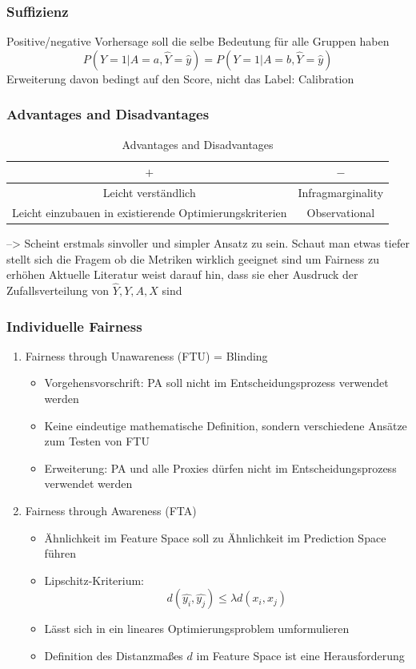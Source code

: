 \documentclass[aspectratio=169]{beamer}
\begin{document}
\begin{frame}
	\frametitle{Suffizienz}
	Positive/negative Vorhersage soll die selbe Bedeutung für alle Gruppen haben
	$$P(Y = 1 | A = a, \hat{Y} = \hat{y}) = P(Y = 1 | A = b, \hat{Y} = \hat{y})$$
	Erweiterung davon bedingt auf den Score, nicht das Label: Calibration
\end{frame}
\begin{frame}
	\frametitle{Advantages and Disadvantages}
	\begin{table}[H]
	\centering
	\begin{tabular}{c|c}
	\toprule
	$+$ & $-$ \\
	\midrule
	Leicht verständlich & Infragmarginality \\
	Leicht einzubauen in existierende Optimierungskriterien & Observational \\
	\bottomrule
	\end{tabular}
	\caption{Advantages and Disadvantages}
	\end{table}
	--> Scheint erstmals sinvoller und simpler Ansatz zu sein. Schaut man etwas tiefer stellt sich
	die Fragem ob die Metriken wirklich geeignet sind um Fairness zu erhöhen
	Aktuelle Literatur weist darauf hin, dass sie eher Ausdruck der Zufallsverteilung
	von $\hat{Y}, Y, A, X$ sind
\end{frame}

\begin{frame}
    \frametitle{Individuelle Fairness}
    \begin{enumerate}
        \item Fairness through Unawareness (FTU) = Blinding
        \begin{itemize}
            \item Vorgehensvorschrift: PA soll nicht im Entscheidungsprozess verwendet werden
            \item Keine eindeutige mathematische Definition, sondern verschiedene Ansätze zum Testen von FTU
            \item Erweiterung: PA und alle Proxies dürfen nicht im Entscheidungsprozess verwendet werden
        \end{itemize}
        
        \item Fairness through Awareness (FTA)
        \begin{itemize}
            \item Ähnlichkeit im Feature Space soll zu Ähnlichkeit im Prediction Space führen
            \item Lipschitz-Kriterium:
            \[
            d(\hat{y_i}, \hat{y_j}) \leq \lambda d(x_i, x_j)
            \]
            \item Lässt sich in ein lineares Optimierungsproblem umformulieren
            \item Definition des Distanzmaßes $d$ im Feature Space ist eine Herausforderung
        \end{itemize}
    \end{enumerate}
\end{frame}
\end{document}
